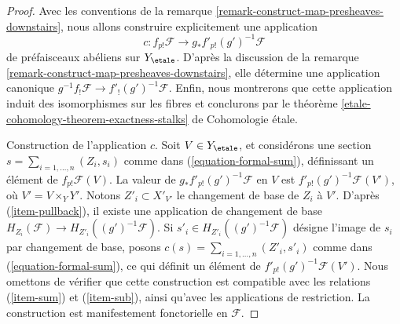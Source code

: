 \begin{proof}
Avec les conventions de la remarque \ref{remark-construct-map-presheaves-downstairs},
nous allons construire explicitement une application
$$
c : f_{p!}\mathcal{F} \longrightarrow g_*f'_{p!}(g')^{-1}\mathcal{F}
$$
de préfaisceaux abéliens sur $Y_\etale$. D'après la discussion de la
remarque \ref{remark-construct-map-presheaves-downstairs},
elle détermine une application canonique
$g^{-1}f_!\mathcal{F} \to f'_!(g')^{-1}\mathcal{F}$. Enfin, nous
montrerons que cette application induit des isomorphismes sur les fibres et conclurons par le
théorème \ref{etale-cohomology-theorem-exactness-stalks} de Cohomologie étale.

\medskip\noindent
Construction de l'application $c$. Soit $V \in Y_\etale$, et considérons une section
$s = \sum_{i = 1, \ldots, n} (Z_i, s_i)$ comme dans
(\ref{equation-formal-sum}), définissant un élément de $f_{p!}\mathcal{F}(V)$.
La valeur de $g_*f'_{p!}(g')^{-1}\mathcal{F}$ en $V$ est
$f'_{p!}(g')^{-1}\mathcal{F}(V')$, où $V' = V \times_Y Y'$.
Notons $Z'_i \subset X'_{V'}$ le changement de base de $Z_i$ à $V'$.
D'après (\ref{item-pullback}), il existe une application de changement de base
$H_{Z_i}(\mathcal{F}) \to H_{Z'_i}((g')^{-1}\mathcal{F})$.
Si $s'_i \in H_{Z'_i}((g')^{-1}\mathcal{F})$ désigne l'image de $s_i$
par changement de base, posons $c(s) = \sum_{i = 1, \ldots, n} (Z'_i, s'_i)$ comme dans
(\ref{equation-formal-sum}), ce qui définit un élément de
$f'_{p!}(g')^{-1}\mathcal{F}(V')$. Nous omettons de vérifier
que cette construction est compatible avec les relations
(\ref{item-sum}) et (\ref{item-sub}), ainsi qu'avec les
applications de restriction. La construction est manifestement
fonctorielle en $\mathcal{F}$.


\end{proof}
